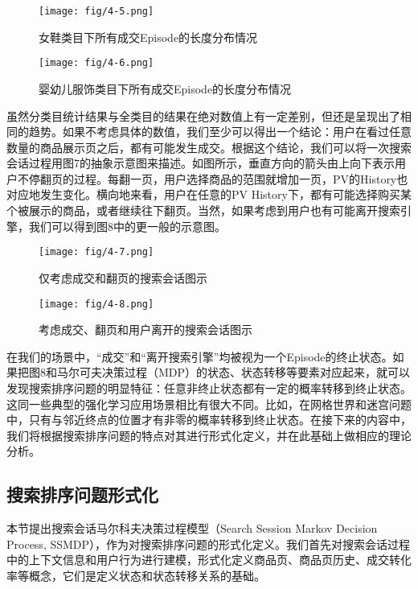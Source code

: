 \begin{figure}[!h]
\centering
\texttt{[image: fig/4-5.png]}
\caption{女鞋类目下所有成交Episode的长度分布情况}
\end{figure}


\begin{figure}[!h]
\centering
\texttt{[image: fig/4-6.png]}
\caption{婴幼儿服饰类目下所有成交Episode的长度分布情况}
\end{figure}


虽然分类目统计结果与全类目的结果在绝对数值上有一定差别，但还是呈现出了相同的趋势。如果不考虑具体的数值，我们至少可以得出一个结论：用户在看过任意数量的商品展示页之后，都有可能发生成交。根据这个结论，我们可以将一次搜索会话过程用图7的抽象示意图来描述。如图所示，垂直方向的箭头由上向下表示用户不停翻页的过程。每翻一页，用户选择商品的范围就增加一页，PV的History也对应地发生变化。横向地来看，用户在任意的PV History下，都有可能选择购买某个被展示的商品，或者继续往下翻页。当然，如果考虑到用户也有可能离开搜索引擎，我们可以得到图8中的更一般的示意图。

\begin{figure}[!h]
\centering
\texttt{[image: fig/4-7.png]}
\caption{仅考虑成交和翻页的搜索会话图示}
\end{figure}

\begin{figure}[!h]
\centering
\texttt{[image: fig/4-8.png]}
\caption{考虑成交、翻页和用户离开的搜索会话图示}
\end{figure}


在我们的场景中，“成交”和“离开搜索引擎”均被视为一个Episode的终止状态。如果把图8和马尔可夫决策过程（MDP）的状态、状态转移等要素对应起来，就可以发现搜索排序问题的明显特征：任意非终止状态都有一定的概率转移到终止状态。这同一些典型的强化学习应用场景相比有很大不同。比如，在网格世界和迷宫问题中，只有与邻近终点的位置才有非零的概率转移到终止状态。在接下来的内容中，我们将根据搜索排序问题的特点对其进行形式化定义，并在此基础上做相应的理论分析。

\subsection{搜索排序问题形式化}
本节提出搜索会话马尔科夫决策过程模型（Search Session Markov Decision Process, SSMDP），作为对搜索排序问题的形式化定义。我们首先对搜索会话过程中的上下文信息和用户行为进行建模，形式化定义商品页、商品页历史、成交转化率等概念，它们是定义状态和状态转移关系的基础。


